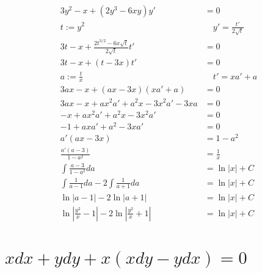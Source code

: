 \begin{align*}
    3y^2-x+(2y^3-6xy)y'                              & = 0                            \\
    t := y^2                                         & \quad y' = \frac{t'}{2\sqrt t} \\
    3t - x + \frac{2t^{3/2} - 6x\sqrt t}{2\sqrt t}t' & = 0                            \\
    3t - x + (t-3x)t'                                & = 0                            \\
    a := \frac{t}{x}                                 & \quad t' = xa' + a             \\
    3ax - x + (ax - 3x)(xa' + a)                     & = 0                            \\
    3ax - x + ax^2a' + a^2x - 3x^2a' - 3xa           & = 0                            \\
    - x + ax^2a' + a^2x - 3x^2a'                     & = 0                            \\
    - 1 + axa' + a^2 - 3xa'                          & = 0                            \\
    a'(ax - 3x)                                      & = 1 - a^2                      \\
    \frac{a'(a - 3)}{1 - a^2}                        & = \frac{1}{x}                  \\
    \int \frac{a - 3}{1 - a^2}da                     & = \ln |x| + C                  \\
    \int \frac{1}{a-1}da - 2\int\frac{1}{a+1}da      & = \ln |x| + C                  \\
    \ln|a-1| - 2\ln|a+1|                             & = \ln |x| + C                  \\
    \ln|\frac{y^2}{x}-1| - 2\ln|\frac{y^2}{x}+1|     & = \ln |x| + C                  \\
\end{align*}

\section{$xdx+ydy+x(xdy-ydx)=0$}

